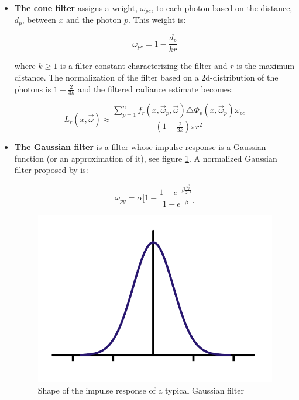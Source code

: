 \begin{itemize}
	\item \textbf{The cone filter} assigns a weight, $\omega_{pc}$, to each photon based on the distance, $d_p$, between $x$ and the photon $p$. This weight is:
	
	\begin{equation*}
		\omega_{pc}=1-\frac{d_p}{kr}
	\end{equation*}
	
	where $k\geq 1$ is a filter constant characterizing the filter and $r$ is the maximum distance. The normalization of the filter based on a 2d-distribution of the photons is $1-\frac{2}{3k}$ and the filtered radiance estimate becomes:
	
	\begin{equation*}
		L_r(x,\vec{\omega})\approx \frac{\sum^{n}_{p=1}f_r(x,\vec{\omega}_p,\vec{\omega})\triangle\Phi_p(x,\vec{\omega}_p)\omega_{pc}}{(1-\frac{2}{3k})\pi r^{2}}
	\end{equation*}
	
	\item \textbf{The Gaussian filter} is a filter whose impulse response is a Gaussian function (or an approximation of it), see figure \ref{f:gaussian-filter}. A normalized Gaussian filter proposed by \cite{a:APracticalGuidetoGlobalIlluminationusingPhotonMaps} is:

	\begin{equation*}
		\omega_{pg}=\alpha \Biggr[ 1-\frac{1-e^{-\beta\frac{d^{2}_p}{2r^{2}}}}{1-e^{-\beta}} \Biggr]	
	\end{equation*}
	
	\begin{figure}
	\sidecaption
		\includegraphics[width=.65\textwidth]{graphics/pm/pm-8}
		\caption{Shape of the impulse response of a typical Gaussian filter}
		\label{f:gaussian-filter}
	\end{figure}
	

\end{itemize}
